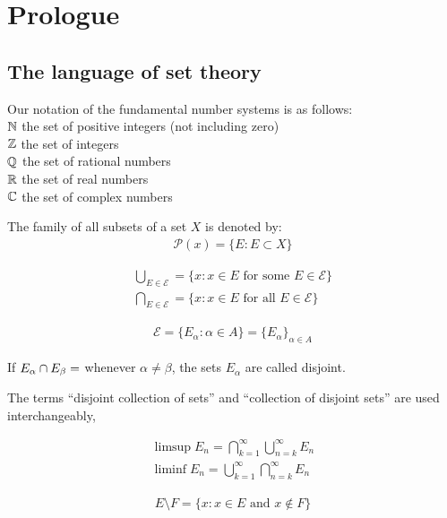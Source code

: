 \setchapterpreamble[u]{\margintoc}
\chapter{Prologue}

\section{The language of set theory}


\begin{definition}
Our notation of the fundamental number systems is as follows: \\
$\mathbb{N}$ the set of positive integers (not including zero) \\
$\mathbb{Z}$ the set of integers \\
$\mathbb{Q}$ the set of rational numbers \\
$\mathbb{R}$ the set of real numbers \\
$\mathbb{C}$ the set of complex numbers
\end{definition}

The family of all subsets of a set $X$ is denoted by:
\begin{align}
\mathcal{P}(x) = \{ E : E \subset X \}
\end{align}

\begin{align}
\bigcup_{E \in \mathcal{E}} = \{ x : x\in E \text{ for some } E \in \mathcal{E} \} \\
\bigcap_{E \in \mathcal{E}} = \{ x : x\in E \text{ for all } E \in \mathcal{E} \}
\end{align}

\begin{align}
\mathcal{E} = \{ E_{\alpha} : \alpha \in A \} = \{E_{\alpha}\}_{\alpha \in A}
\end{align}

If $E_{\alpha} \cap E_{\beta} = \empty$ whenever $\alpha \ne \beta$, the sets $E_{\alpha}$ are called disjoint.

The terms ``disjoint collection of sets'' and ``collection of disjoint sets'' are used interchangeably,

\begin{align}
\limsup E_n = \bigcap_{k=1}^{\infty} \bigcup_{n=k}^{\infty} E_n \\
\liminf E_n = \bigcup_{k=1}^{\infty} \bigcap_{n=k}^{\infty} E_n
\end{align}

\begin{align}
E \setminus F = \{ x : x \in E \text{ and } x \notin F \}
\end{align}

